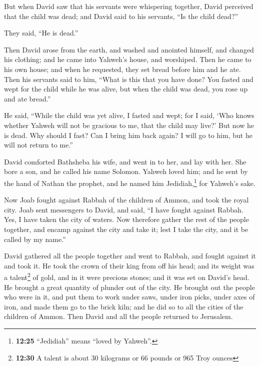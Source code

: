 \begin{paracol}{2}
\begin{otherlanguage}{english}
 But when David saw that his servants were whispering
together, David perceived that the child was dead; and David said to his
servants, ``Is the child dead?''

They said, ``He is dead.''

 Then David arose from the earth, and washed and anointed
himself, and changed his clothing; and he came into Yahweh's house, and
worshiped. Then he came to his own house; and when he requested, they
set bread before him and he ate.  Then his servants said
to him, ``What is this that you have done? You fasted and wept for the
child while he was alive, but when the child was dead, you rose up and
ate bread.''

 He said, ``While the child was yet alive, I fasted and
wept; for I said, `Who knows whether Yahweh will not be gracious to me,
that the child may live?'  But now he is dead. Why should
I fast? Can I bring him back again? I will go to him, but he will not
return to me.''

 David comforted Bathsheba his wife, and went in to her,
and lay with her. She bore a son, and he called his name Solomon. Yahweh
loved him;  and he sent by the hand of Nathan the
prophet, and he named him Jedidiah,\footnote{\textbf{12:25} ``Jedidiah''
  means ``loved by Yahweh''.} for Yahweh's sake.

 Now Joab fought against Rabbah of the children of Ammon,
and took the royal city.  Joab sent messengers to David,
and said, ``I have fought against Rabbah. Yes, I have taken the city of
waters.  Now therefore gather the rest of the people
together, and encamp against the city and take it; lest I take the city,
and it be called by my name.''

 David gathered all the people together and went to
Rabbah, and fought against it and took it.  He took the
crown of their king from off his head; and its weight was a
talent\footnote{\textbf{12:30} A talent is about 30 kilograms or 66
  pounds or 965 Troy ounces} of gold, and in it were precious stones;
and it was set on David's head. He brought a great quantity of plunder
out of the city.  He brought out the people who were in
it, and put them to work under saws, under iron picks, under axes of
iron, and made them go to the brick kiln; and he did so to all the
cities of the children of Ammon. Then David and all the people returned
to Jerusalem.


\end{otherlanguage}
\end{paracol}
